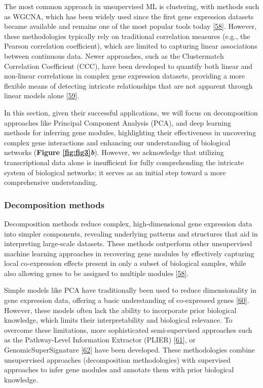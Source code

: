 The most common approach in unsupervised ML is clustering, with methods such as WGCNA, which has been widely used since the first gene expression datasets became available and remains one of the most popular tools today {[}\protect\hyperlink{ref-1BVbSrr6M}{58}{]}.
However, these methodologies typically rely on traditional correlation measures (e.g., the Pearson correlation coefficient), which are limited to capturing linear associations between continuous data.
Newer approaches, such as the Clustermatch Correlation Coefficient (CCC), have been developed to quantify both linear and non-linear correlations in complex gene expression datasets, providing a more flexible means of detecting intricate relationships that are not apparent through linear models alone {[}\protect\hyperlink{ref-YgLIM2bZ}{59}{]}.

In this section, given their successful applications, we will focus on decomposition approaches like Principal Component Analysis (PCA), and deep learning methods for inferring gene modules, highlighting their effectiveness in uncovering complex gene interactions and enhancing our understanding of biological networks (\textbf{Figure \ref{fig:fig3}\emph{b}}).
However, we acknowledge that utilizing transcriptional data alone is insufficient for fully comprehending the intricate system of biological networks; it serves as an initial step toward a more comprehensive understanding.

\hypertarget{decomposition-methods}{%
\subsubsection{Decomposition methods}\label{decomposition-methods}}

Decomposition methods reduce complex, high-dimensional gene expression data into simpler components, revealing underlying patterns and structures that aid in interpreting large-scale datasets.
These methods outperform other unsupervised machine learning approaches in recovering gene modules by effectively capturing local co-expression effects present in only a subset of biological samples, while also allowing genes to be assigned to multiple modules {[}\protect\hyperlink{ref-1BVbSrr6M}{58}{]}.

Simple models like PCA have traditionally been used to reduce dimensionality in gene expression data, offering a basic understanding of co-expressed genes {[}\protect\hyperlink{ref-1703M7bru}{60}{]}.
However, these models often lack the ability to incorporate prior biological knowledge, which limits their interpretability and biological relevance.
To overcome these limitations, more sophisticated semi-supervised approaches such as the Pathway-Level Information Extractor (PLIER) {[}\protect\hyperlink{ref-Ki2ij7zE}{61}{]}, or GenomicSuperSignature {[}\protect\hyperlink{ref-X4fhSCkz}{62}{]} have been developed.
These methodologies combine unsupervised approaches (decomposition methodologies) with supervised approaches to infer gene modules and annotate them with prior biological knowledge.

